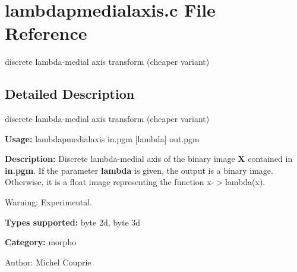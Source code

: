 \section{lambdapmedialaxis.c File Reference}
\label{lambdapmedialaxis_8c}
discrete lambda-medial axis transform (cheaper variant)  




\label{_details}
\subsection{Detailed Description}
discrete lambda-medial axis transform (cheaper variant) 

{\bf Usage:} lambdapmedialaxis in.pgm [lambda] out.pgm

{\bf Description:} Discrete lambda-medial axis of the binary image {\bf X} contained in {\bf in.pgm}. If the parameter {\bf lambda} is given, the output is a binary image. Otherwise, it is a float image representing the function x-$>$lambda(x).

\begin{Desc}
\item[Warning:]Experimental.\end{Desc}
{\bf Types supported:} byte 2d, byte 3d

{\bf Category:} morpho

\begin{Desc}
\item[Author:]Michel Couprie \end{Desc}
